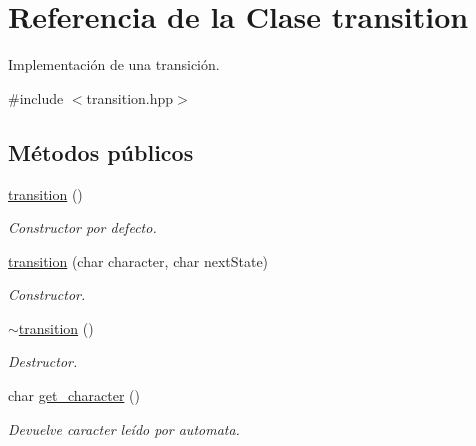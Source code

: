 \hypertarget{classtransition}{}\section{Referencia de la Clase transition}
\label{classtransition}


Implementación de una transición.  




{\ttfamily \#include $<$transition.\+hpp$>$}

\subsection*{Métodos públicos}
\begin{DoxyCompactItemize}
\item 
\mbox{\label{classtransition_ad42373578409e44b43e00fb900b87060}} 
\mbox{\hyperlink{classtransition_ad42373578409e44b43e00fb900b87060}{transition}} ()
\begin{DoxyCompactList}\small\item\em Constructor por defecto. \end{DoxyCompactList}\item 
\mbox{\label{classtransition_a7966b46cc8cb2cec95d949772a0fd124}} 
\mbox{\hyperlink{classtransition_a7966b46cc8cb2cec95d949772a0fd124}{transition}} (char character, char next\+State)
\begin{DoxyCompactList}\small\item\em Constructor. \end{DoxyCompactList}\item 
\mbox{\label{classtransition_ab98facd9f32969411251ecdabe2b6da4}} 
\mbox{\hyperlink{classtransition_ab98facd9f32969411251ecdabe2b6da4}{$\sim$transition}} ()
\begin{DoxyCompactList}\small\item\em Destructor. \end{DoxyCompactList}\item 
\mbox{\label{classtransition_a2662dbecd399cdf4c1bc56de743ba4cb}} 
char \mbox{\hyperlink{classtransition_a2662dbecd399cdf4c1bc56de743ba4cb}{get\+\_\+character}} ()
\begin{DoxyCompactList}\small\item\em Devuelve caracter leído por automata. \end{DoxyCompactList}\item 

\end{DoxyCompactItemize}
